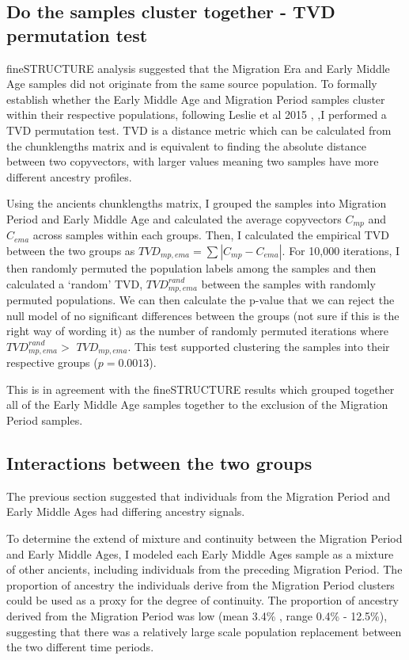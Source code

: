 \subsection{Do the samples cluster together - TVD permutation test}

fineSTRUCTURE analysis suggested that the Migration Era and Early Middle Age samples did not originate from the same source population. To formally establish whether the Early Middle Age and Migration Period samples cluster within their respective populations, following Leslie et al 2015 \cite{Leslie2015}, ,I performed a TVD permutation test. TVD is a distance metric which can be calculated from the chunklengths matrix and is equivalent to finding the absolute distance between two copyvectors, with larger values meaning two samples have more different ancestry profiles.

Using the ancients chunklengths matrix, I grouped the samples into Migration Period and Early Middle Age and  calculated the average copyvectors $C_{mp}$ and $C_{ema}$ across samples within each groups. Then, I calculated the empirical TVD between the two groups as $TVD_{mp,ema} = \sum |C_{mp} - C_{ema}|$. For 10,000 iterations, I then randomly permuted the population labels among the samples and then calculated a `random' TVD, $TVD_{mp,ema}^{rand}$ between the samples with randomly permuted populations. We can then calculate the p-value that we can reject the null model of no significant differences between the groups (not sure if this is the right way of wording it) as the number of randomly permuted iterations where $TVD_{mp,ema}^{rand} > $ $TVD_{mp,ema}$. This test supported clustering the samples into their respective groups ($p=0.0013$).

This is in agreement with the fineSTRUCTURE results which grouped together all of the Early Middle Age samples together to the exclusion of the Migration Period samples. 

\subsection{Interactions between the two groups}

The previous section suggested that individuals from the Migration Period and Early Middle Ages had differing ancestry signals. 

To determine the extend of mixture and continuity between the Migration Period and Early Middle Ages, I modeled each Early Middle Ages sample as a mixture of other ancients, including individuals from the preceding Migration Period. The proportion of ancestry the individuals derive from the Migration Period clusters could be used as a proxy for the degree of continuity. The proportion of ancestry derived from the Migration Period was low (mean 3.4\% , range 0.4\% - 12.5\%), suggesting that there was a relatively large scale population replacement between the two different time periods. 

